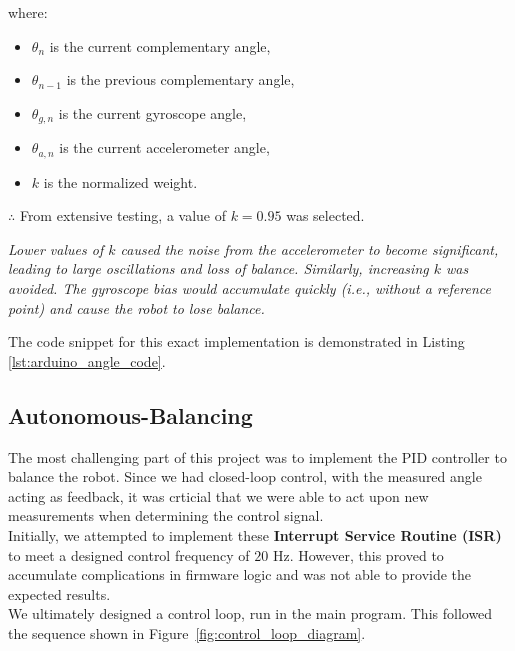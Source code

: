 \documentclass{article}
\begin{document}
where:
\begin{itemize}
    \item $\theta_n$ is the current complementary angle,
    \item $\theta_{n-1}$ is the previous complementary angle,
    \item $\theta_{g,n}$ is the current gyroscope angle,
    \item $\theta_{a,n}$ is the current accelerometer angle,
    \item $k$ is the normalized weight.
\end{itemize}

\begin{center}
    $\therefore$ From extensive testing, a value of $k = 0.95$ was selected. \\
\end{center}

\textit{
    Lower values of $k$ caused the noise from the accelerometer to become significant, leading to large oscillations and loss of balance.
    Similarly, increasing $k$ was avoided. The gyroscope bias would accumulate quickly (i.e., without a reference point)
    and cause the robot to lose balance.
}\vspace{0.5cm}

The code snippet for this exact implementation is demonstrated in Listing \ref{lst:arduino_angle_code}.

\subsection{Autonomous-Balancing}

\begin{minipage}{\linewidth}
    The most challenging part of this project was to implement the PID controller to balance the robot. Since we had closed-loop control,
    with the measured angle acting as feedback, it was crticial that we were able to act upon new measurements when determining the control signal. \\

    Initially, we attempted to implement these \textbf{Interrupt Service Routine (ISR)} to meet a designed control frequency of $20$ Hz.
    However, this proved to accumulate complications in firmware logic and was not able to provide the expected results. \\

    We ultimately designed a control loop, run in the main program. This followed the sequence shown in Figure~\ref{fig:control_loop_diagram}.
\end{minipage}
\end{document}
